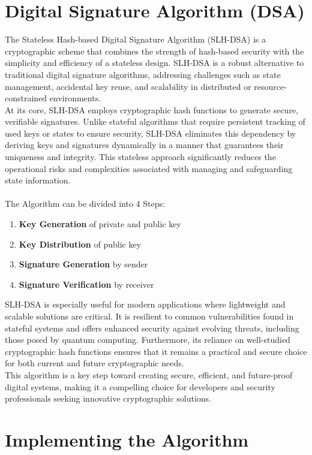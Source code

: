 \documentclass[journal=tosc,notanonymous]{iacrtrans}
\begin{document}
\section{Digital Signature Algorithm (DSA)}
The Stateless Hash-based Digital Signature Algorithm (SLH-DSA) is a cryptographic scheme that combines the strength of hash-based security with the simplicity and efficiency of a stateless design. SLH-DSA is a robust alternative to traditional digital signature algorithms, addressing challenges such as state management, accidental key reuse, and scalability in distributed or resource-constrained environments.
\\
At its core, SLH-DSA employs cryptographic hash functions to generate secure, verifiable signatures. Unlike stateful algorithms that require persistent tracking of used keys or states to ensure security, SLH-DSA eliminates this dependency by deriving keys and signatures dynamically in a manner that guarantees their uniqueness and integrity. This stateless approach significantly reduces the operational risks and complexities associated with managing and safeguarding state information.\\
\\
The Algorithm can be divided into 4 Steps:
\begin{enumerate}
	\item \textbf{Key Generation} of private and public key
	\item \textbf{Key Distribution}  of public key
	\item \textbf{Signature Generation} by sender
	\item \textbf{Signature Verification} by receiver
\end{enumerate}
SLH-DSA is especially useful for modern applications where lightweight and scalable solutions are critical. It is resilient to common vulnerabilities found in stateful systems and offers enhanced security against evolving threats, including those posed by quantum computing. Furthermore, its reliance on well-studied cryptographic hash functions ensures that it remains a practical and secure choice for both current and future cryptographic needs.
\\
This algorithm is a key step toward creating secure, efficient, and future-proof digital systems, making it a compelling choice for developers and security professionals seeking innovative cryptographic solutions.

\section{Implementing the Algorithm}
\lipsum[9]
\end{document}
